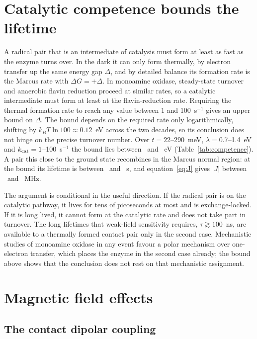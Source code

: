 \documentclass[journal=jpcbfk,manuscript=article,layout=traditional]{achemso}
\begin{document}
\section{Catalytic competence bounds the lifetime}

A radical pair that is an intermediate of catalysis must form at least as fast
as the enzyme turns over. In the dark it can only form thermally, by electron
transfer up the same energy gap $\Delta$, and by detailed balance its formation
rate is the Marcus rate with $\Delta G = +\Delta$. In monoamine oxidase, steady-state turnover and
anaerobic flavin reduction proceed at similar rates,\cite{Miller1999} so
a catalytic intermediate must form at least at the flavin-reduction rate.
Requiring the thermal formation rate to reach any value between 1 and
100~s$^{-1}$ gives an upper bound on $\Delta$. The bound depends on the required
rate only logarithmically, shifting by $k_BT\ln100\approx0.12$~eV across the two
decades, so its conclusion does not hinge on the precise turnover number. Over
$t = 22$--290~meV, $\lambda = 0.7$--1.4~eV and $k_{\rm cat} = 1$--100~s$^{-1}$ the
bound lies between \DeltaMaxMin\ and \DeltaMaxMax~eV (Table~\ref{tab:competence}).
A pair this close to the ground state recombines in the Marcus normal region: at
the bound its lifetime is between \tauCompMin\ and \tauCompMax~s, and
equation~\ref{eq:J} gives $|J|$ between \JCompMin\ and \JCompMax~MHz.

The argument is conditional in the useful direction. If the radical pair is on
the catalytic pathway, it lives for tens of picoseconds at most and is
exchange-locked. If it is long
lived, it cannot form at the catalytic rate and does not take part in turnover.
The long lifetimes that weak-field sensitivity requires, $\tau\gtrsim100$~ns, are
available to a thermally formed contact pair only in the second case. Mechanistic
studies of monoamine oxidase in any event favour a polar mechanism over one-electron
transfer,\cite{Edmondson2007,Miller1999,Repic2013} which places the enzyme in the
second case already; the bound above shows that the conclusion does not rest on
that mechanistic assignment.

\section{Magnetic field effects}

\subsection{The contact dipolar coupling}
\label{sec:dipolar}
\end{document}
